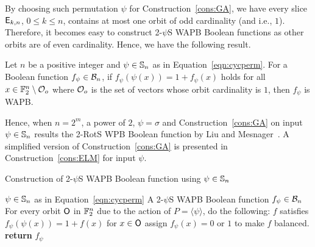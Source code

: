 \documentclass{llncs}
\begin{document}
By choosing such permutation $\psi$ for Construction~\ref{cons:GA}, we have every slice $\mathsf{E}_{k,n}$, $0 \leq k \leq n$, contains at most one orbit of odd cardinality (and i.e., $1$). Therefore, it becomes easy to construct 2-$\psi$S WAPB Boolean functions as other orbits are of even cardinality. Hence, we have the following result.
\begin{proposition}\label{prop:WAPB}
Let $n$ be a positive integer and $\psi \in \mathbb{S}_n$ as in Equation~\ref{eqn:cycperm}.
For a Boolean function $f_\psi \in \mathcal{B}_n$, if $f_\psi(\psi(x)) = 1+f_\psi(x)$ holds for all $x \in \mathbb{F}_2^n \setminus \mathcal{O}_o$ where $\mathcal{O}_o$ is the set of vectors whose orbit cardinality is $1$, then $f_\psi$ is WAPB.
\end{proposition}
Hence, when $n = 2^m$, a power of $2$, $\psi = \sigma$ and Construction~\ref{cons:GA} on input $\psi \in \mathbb{S}_n$ results the 2-RotS WPB Boolean function by Liu and Mesnager~\cite{DCC:LiuMes19}. A simplified version of Construction~\ref{cons:GA} is presented in Construction~\ref{cons:ELM} for input $\psi$.
\begin{constr}\label{cons:ELM}
\caption{Construction of 2-$\psi$S WAPB Boolean function using $\psi \in \mathbb{S}_n$}
\begin{algorithmic}%
\Require $\psi \in \mathbb{S}_n$ as in Equation~\ref{eqn:cycperm}
\Ensure A 2-$\psi$S WAPB Boolean function $f_\psi \in \mathcal{B}_n$
\State For every orbit $\mathsf{O}$ in $\mathbb{F}_2^n$ due to the action of $P = \langle \psi \rangle$, do the following:
	\State $f$ satisfies $f_\psi(\psi(x)) = 1+f(x)$ for $x \in \mathsf{O}$
\EndIf
{}
	\State assign $f_\psi(x) = 0$ or $1$ to make $f$ balanced.
\EndIf
\State \textbf{return} $f_\psi$
\end{algorithmic}
\end{constr}
\end{document}
